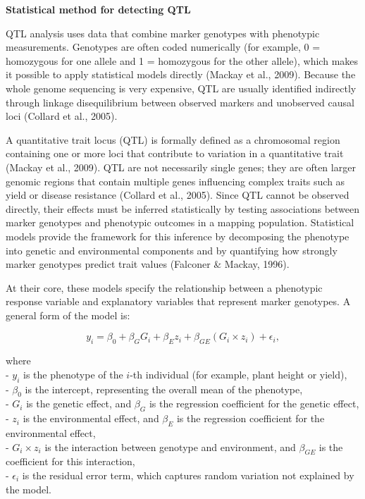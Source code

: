 \documentclass[
  letterpaper,
  DIV=11,
  numbers=noendperiod]{scrartcl}
\begin{document}
\textbf{Statistical method for detecting QTL}

QTL analysis uses data that combine marker genotypes with phenotypic
measurements. Genotypes are often coded numerically (for example, 0 =
homozygous for one allele and 1 = homozygous for the other allele),
which makes it possible to apply statistical models directly (Mackay et
al., 2009). Because the whole genome sequencing is very expensive, QTL
are usually identified indirectly through linkage disequilibrium between
observed markers and unobserved causal loci (Collard et al., 2005).

A quantitative trait locus (QTL) is formally defined as a chromosomal
region containing one or more loci that contribute to variation in a
quantitative trait (Mackay et al., 2009). QTL are not necessarily single
genes; they are often larger genomic regions that contain multiple genes
influencing complex traits such as yield or disease resistance (Collard
et al., 2005). Since QTL cannot be observed directly, their effects must
be inferred statistically by testing associations between marker
genotypes and phenotypic outcomes in a mapping population. Statistical
models provide the framework for this inference by decomposing the
phenotype into genetic and environmental components and by quantifying
how strongly marker genotypes predict trait values (Falconer \& Mackay,
1996).

At their core, these models specify the relationship between a
phenotypic response variable and explanatory variables that represent
marker genotypes. A general form of the model is:

\[
y_i = \beta_0 + \beta_G G_i + \beta_E z_i + \beta_{GE}(G_i \times z_i) + \epsilon_i,
\]

where\\
- \(y_i\) is the phenotype of the \(i\)-th individual (for example,
plant height or yield),\\
- \(\beta_0\) is the intercept, representing the overall mean of the
phenotype,\\
- \(G_i\) is the genetic effect, and \(\beta_G\) is the regression
coefficient for the genetic effect,\\
- \(z_i\) is the environmental effect, and \(\beta_E\) is the regression
coefficient for the environmental effect,\\
- \(G_i \times z_i\) is the interaction between genotype and
environment, and \(\beta_{GE}\) is the coefficient for this
interaction,\\
- \(\epsilon_i\) is the residual error term, which captures random
variation not explained by the model.
\end{document}
